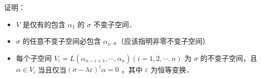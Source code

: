 \documentclass{article}
\begin{document}
证明：

\begin{itemize}
  \item[（1）] \(V\) 是仅有的包含 \(\alpha_{1}\) 的 \(\sigma\) 不变子空间．
  \item[（2）] \(\sigma\) 的任意不变子空间必包含 \(\alpha_{n}\) 。（应该指明非零不变子空间）
  \item[（3）] 每个子空间 \(V_{i}=L\left(\alpha_{n-i+1}, \cdots, \alpha_{n}\right)(i=1,2, \cdots, n)\) 为 \(\sigma\) 的不变子空间，且 \(\alpha \in V_{i}\) 当且仅当\((\sigma-\lambda \varepsilon)^{i} \alpha=0\) ，其中 \(\varepsilon\) 为恒等变换．
\end{itemize}
\end{document}
